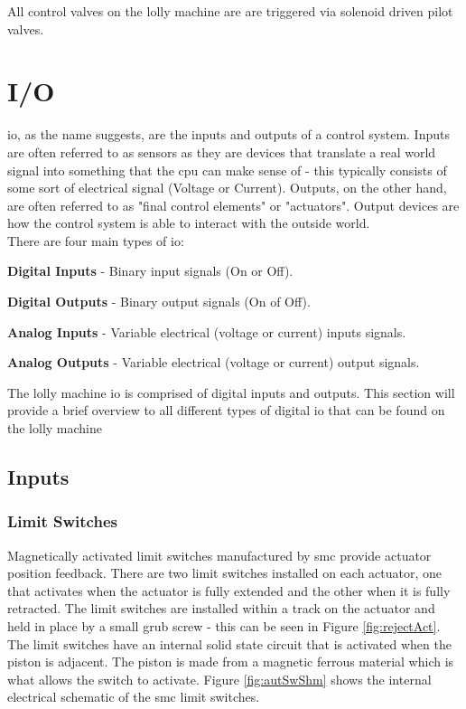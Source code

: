     All control valves on the lolly machine are are triggered via solenoid driven pilot valves.

\section{I/O}
    
    \acrfull{io}, as the name suggests, are the inputs and outputs of a control system. Inputs are often referred to as sensors as they are devices that translate a real world signal into something that the \acrshort{cpu} can make sense of - this typically consists of some sort of electrical signal (Voltage or Current). Outputs, on the other hand, are often referred to as "final control elements" or "actuators". Output devices are how the control system is able to interact with the outside world.\\
    There are four main types of \acrshort{io}:

    \begin{description}
    \item\textbf{Digital Inputs} - Binary input signals (On or Off).
    \item\textbf{Digital Outputs} - Binary output signals (On of Off).
    \item\textbf{Analog Inputs} - Variable electrical (voltage or current) inputs signals.
    \item\textbf{Analog Outputs} - Variable electrical (voltage or current) output signals.
    \end{description}
    
    The lolly machine \acrshort{io} is comprised of digital inputs and outputs. This section will provide a brief overview to all different types of digital \acrshort{io} that can be found on the lolly machine

\subsection{Inputs}
    \subsubsection{Limit Switches}
        Magnetically activated limit switches manufactured by \acrshort{smc} provide actuator position feedback. There are two limit switches installed on each actuator, one that activates when the actuator is fully extended and the other when it is fully retracted. The limit switches are installed within a track on the actuator and held in place by a small grub screw - this can be seen in Figure \ref{fig:rejectAct}.
        The limit switches have an internal solid state circuit that is activated when the piston is adjacent. The piston is made from a magnetic ferrous material which is what allows the switch to activate. 
        Figure \ref{fig:autSwShm} shows the internal electrical schematic of the \acrshort{smc} limit switches.
        
